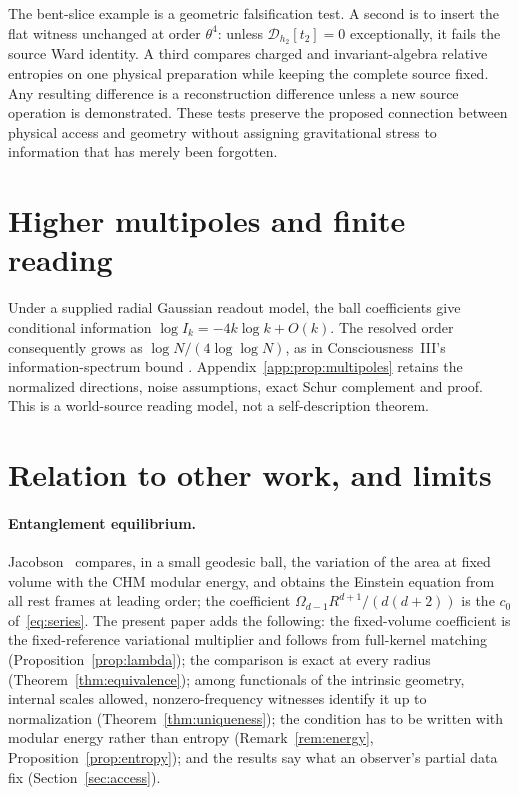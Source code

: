 \documentclass[12pt]{article}
\theoremstyle{definition}
\theoremstyle{remark}
\begin{document}
The bent-slice example is a geometric falsification test. A second is
to insert the flat witness unchanged at order $\theta^4$: unless
$\mathcal D_{h_2}[t_2]=0$ exceptionally, it fails the source Ward identity.
A third compares charged and invariant-algebra relative entropies on
one physical preparation while keeping the complete source fixed.
Any resulting difference is a reconstruction difference unless a new
source operation is demonstrated. These tests preserve the proposed
connection between physical access and geometry without assigning
gravitational stress to information that has merely been forgotten.

\section{Higher multipoles and finite reading}\label{sec:multipoles}

Under a supplied radial Gaussian readout model, the ball coefficients
give conditional information $\log I_k=-4k\log k+O(k)$.
The resolved order consequently grows as $\log N/(4\log\log N)$,
as in Consciousness~III's information-spectrum bound \cite{PaperIII}.
Appendix~\ref{app:prop:multipoles} retains the normalized directions,
noise assumptions, exact Schur complement and proof. This is a
world-source reading model, not a self-description theorem.

\section{Relation to other work, and limits}\label{sec:relation}

\paragraph{Entanglement equilibrium.} Jacobson~\cite{Jacobson2016} compares, in a small
geodesic ball, the variation of the area at fixed volume with the CHM modular energy, and
obtains the Einstein equation from all rest frames at leading order; the coefficient
\(\Omega_{d-1}R^{d+1}/(d(d+2))\) is the \(c_0\) of~\eqref{eq:series}. The present paper adds
the following: the fixed-volume coefficient is the fixed-reference variational multiplier and
follows from full-kernel matching (Proposition~\ref{prop:lambda}); the
comparison is exact at every radius (Theorem~\ref{thm:equivalence}); among functionals of
the intrinsic geometry, internal scales allowed, nonzero-frequency witnesses identify it up to normalization
(Theorem~\ref{thm:uniqueness}); the condition has to be written with modular energy
rather than entropy (Remark~\ref{rem:energy}, Proposition~\ref{prop:entropy}); and the
results say what an observer's partial data fix (Section~\ref{sec:access}).
\end{document}
